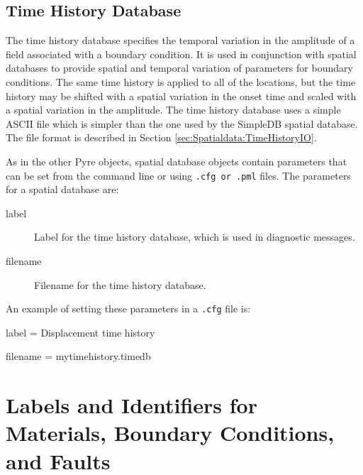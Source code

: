 \subsection{Time History Database}

The time history database specifies the temporal variation in the
amplitude of a field associated with a boundary condition. It is used
in conjunction with spatial databases to provide spatial and temporal
variation of parameters for boundary conditions. The same time history
is applied to all of the locations, but the time history may be shifted
with a spatial variation in the onset time and scaled with a spatial
variation in the amplitude. The time history database uses a simple
ASCII file which is simpler than the one used by the SimpleDB spatial
database. The file format is described in Section \vref{sec:Spatialdata:TimeHistoryIO}. 

As in the other Pyre objects, spatial database objects contain parameters
that can be set from the command line or using \texttt{.cfg or .pml}
files. The parameters for a spatial database are:
\begin{description}
\item [{label}] Label for the time history database, which is used in diagnostic
messages.
\item [{filename}] Filename for the time history database.
\end{description}
An example of setting these parameters in a \texttt{.cfg} file is:
\begin{lyxcode}
label = Displacement time history

filename = mytimehistory.timedb
\end{lyxcode}

\section{Labels and Identifiers for Materials, Boundary Conditions, and Faults}

